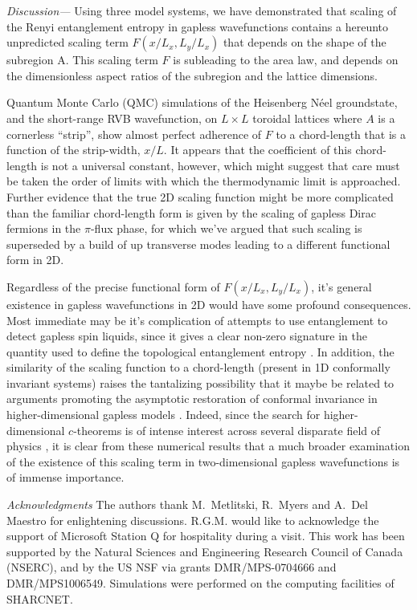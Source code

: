 \documentclass[prl,aps,twocolumn,floatfix,amsmath,amssymb,superscriptaddress,tightenlines]{revtex4}
\begin{document}
{\it Discussion---} Using three model systems, we have demonstrated that scaling of the Renyi entanglement entropy in gapless wavefunctions contains a hereunto unpredicted scaling term $F(x/L_x,L_y/L_x)$ that depends on the shape of the subregion A.  This scaling term $F$ is subleading to the area law, and depends on the dimensionless aspect ratios of the subregion and the lattice dimensions.

Quantum Monte Carlo (QMC) simulations of the Heisenberg N\'eel groundstate, and the short-range RVB wavefunction, on $L \times L$ toroidal lattices where $A$ is a cornerless ``strip'', show almost perfect adherence of $F$ to a chord-length that is a function of the strip-width, $x/L$.
It appears that the coefficient of this chord-length is not a universal constant, however, which might suggest that care must be taken the order of limits with which the thermodynamic limit is approached.  Further evidence that the true 2D scaling function might be more complicated than the familiar chord-length form is given by the scaling of gapless Dirac fermions in the $\pi$-flux phase, for which we've argued that such scaling is superseded by a build of up transverse modes leading to a different functional form in 2D.

Regardless of the precise functional form of $F(x/L_x,L_y/L_x)$, it's general existence in gapless wavefunctions in 2D would have some profound consequences.  Most immediate may be it's complication of attempts to use entanglement to detect gapless spin liquids,
since it gives a clear non-zero signature in the quantity used to define the topological entanglement entropy \cite{KP,LW}.
In addition, the similarity of the scaling function to a chord-length (present in 1D conformally invariant systems) 
raises the tantalizing possibility that it maybe be related to arguments promoting the asymptotic restoration of conformal invariance in higher-dimensional gapless models \cite{Shredder}.  
Indeed, since the search for higher-dimensional $c$-theorems is of intense interest across several disparate field of physics \cite{Zamo,ryu,Myers},
it is clear from these numerical results that a much broader examination of the existence of this scaling term in two-dimensional gapless 
wavefunctions is of immense importance.

{\it Acknowledgments} 
The authors thank M.~Metlitski, R.~Myers and A.~Del Maestro for enlightening discussions. 
R.G.M. would like to acknowledge the support of Microsoft Station Q for hospitality during a visit.
This work has been supported by the Natural Sciences and Engineering
Research Council of Canada (NSERC), and by the US NSF via grants DMR/MPS-0704666 and DMR/MPS1006549.  Simulations were performed on the computing facilities of SHARCNET.



\end{document}
